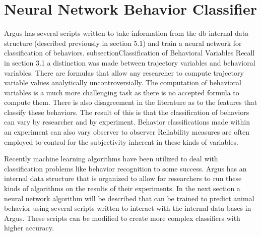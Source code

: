 \documentclass[12pt,titlepage]{report}
\begin{document}
\section{Neural Network Behavior Classifier}
Argus has several scripts written to take information from the db internal data structure (described previously in section 5.1) and train a neural network for classification of behaviors.
subsection{Classification of Behavioral Variables}
Recall in section 3.1 a distinction was made between trajectory variables and behavioral variables. There are formulas that allow any researcher to compute trajectory variable values analytically uncontroversially. The computation of behavioral variables is a much more challenging task as there is no accepted formula to compute them. There is also disagreement in the literature as to the features that classify these behaviors. The result of this is that the classification of behaviors can vary by researcher and by experiment. Behavior classifications made within an experiment can also vary observer to observer Reliability measures are often employed to control for the subjectivity inherent in these kinds of variables.

Recently machine learning algorithms have been utilized to deal with classification problems like behavior recognition to some success. Argus has an internal data structure that is organized to allow for researchers to run these kinds of algorithms on the results of their experiments. In the next section a neural network algorithm will be described that can be trained to predict animal behavior using several scripts written to interact with the internal data bases in Argus. These scripts can be modified to create more complex classifiers with higher accuracy.
\end{document}
